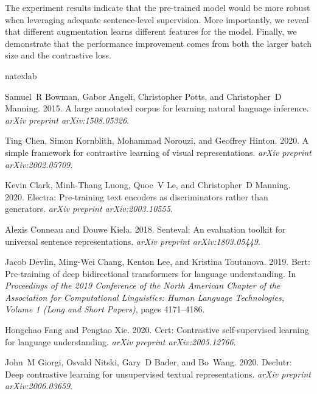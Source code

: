 \documentclass[11pt,a4paper]{article}
\begin{document}
The experiment results indicate that the pre-trained model would be more robust when leveraging adequate sentence-level supervision. More importantly, we reveal that different augmentation learns different features for the model. Finally, we demonstrate that the performance improvement comes from both the larger batch size and the contrastive loss.  
\begin{thebibliography}{32}
\expandafter\ifx\csname natexlab\endcsname\relax\def\natexlab#1{#1}\fi

Samuel~R Bowman, Gabor Angeli, Christopher Potts, and Christopher~D Manning.
  2015.
\newblock A large annotated corpus for learning natural language inference.
\newblock \emph{arXiv preprint arXiv:1508.05326}.

Ting Chen, Simon Kornblith, Mohammad Norouzi, and Geoffrey Hinton. 2020.
\newblock A simple framework for contrastive learning of visual
  representations.
\newblock \emph{arXiv preprint arXiv:2002.05709}.

Kevin Clark, Minh-Thang Luong, Quoc~V Le, and Christopher~D Manning. 2020.
\newblock Electra: Pre-training text encoders as discriminators rather than
  generators.
\newblock \emph{arXiv preprint arXiv:2003.10555}.

Alexis Conneau and Douwe Kiela. 2018.
\newblock Senteval: An evaluation toolkit for universal sentence
  representations.
\newblock \emph{arXiv preprint arXiv:1803.05449}.

Jacob Devlin, Ming-Wei Chang, Kenton Lee, and Kristina Toutanova. 2019.
\newblock Bert: Pre-training of deep bidirectional transformers for language
  understanding.
\newblock In \emph{Proceedings of the 2019 Conference of the North American
  Chapter of the Association for Computational Linguistics: Human Language
  Technologies, Volume 1 (Long and Short Papers)}, pages 4171--4186.

Hongchao Fang and Pengtao Xie. 2020.
\newblock Cert: Contrastive self-supervised learning for language
  understanding.
\newblock \emph{arXiv preprint arXiv:2005.12766}.

John~M Giorgi, Osvald Nitski, Gary~D Bader, and Bo~Wang. 2020.
\newblock Declutr: Deep contrastive learning for unsupervised textual
  representations.
\newblock \emph{arXiv preprint arXiv:2006.03659}.


\end{thebibliography}
\end{document}

